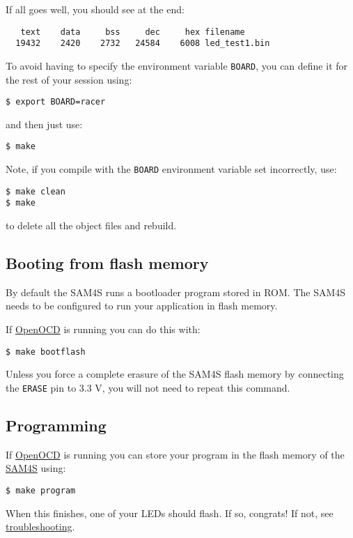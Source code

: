 If all goes well, you should see at the end:
%
\begin{verbatim}
   text    data     bss     dec     hex filename
  19432    2420    2732   24584    6008 led_test1.bin
\end{verbatim}

To avoid having to specify the environment variable \texttt{BOARD}, you
can define it for the rest of your session using:
%
\begin{verbatim}
$ export BOARD=racer
\end{verbatim}
%
and then just use:
%
\begin{verbatim}
$ make
\end{verbatim}

Note, if you compile with the \texttt{BOARD} environment variable set incorrectly, use:
%
\begin{verbatim}
$ make clean
$ make  
\end{verbatim}
%
to delete all the object files and rebuild.


\subsection{Booting from flash memory}
\label{booting-from-flash-memory}

By default the SAM4S runs a bootloader program stored in ROM. The SAM4S
needs to be configured to run your application in flash memory.

If \url{OpenOCD} is running you can do this with:

\begin{verbatim}
$ make bootflash
\end{verbatim}

Unless you force a complete erasure of the SAM4S flash memory by
connecting the \texttt{ERASE} pin to 3.3 V, you will not need to repeat
this command.

\subsection{Programming}
\label{programming}

If \url{OpenOCD} is running you can store your program in the flash
memory of the \url{SAM4S} using:

\begin{verbatim}
$ make program
\end{verbatim}

When this finishes, one of your LEDs should flash. If so, congrats! If
not, see \protect\hyperref[troubleshooting]{troubleshooting}.


